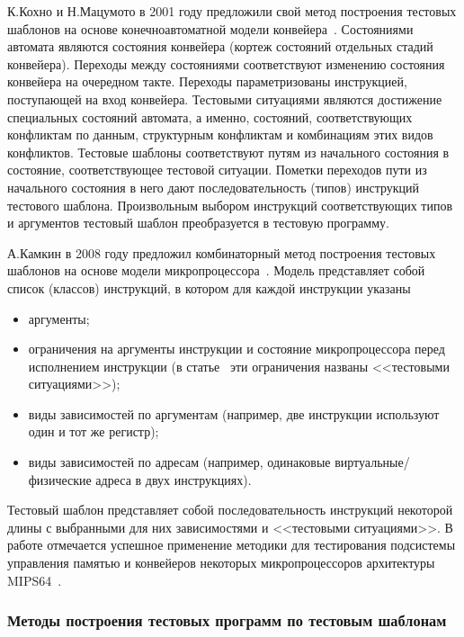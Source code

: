 К.Кохно и Н.Мацумото в 2001 году предложили свой метод построения тестовых шаблонов на основе конечноавтоматной модели конвейера~\cite{mVpGen}. Состояниями автомата являются состояния конвейера (кортеж состояний отдельных стадий конвейера). Переходы между состояниями соответствуют изменению состояния конвейера на очередном такте. Переходы параметризованы инструкцией, поступающей на вход конвейера. Тестовыми ситуациями являются достижение специальных состояний автомата, а именно, состояний, соответствующих конфликтам по данным, структурным конфликтам и комбинациям этих видов конфликтов. Тестовые шаблоны соответствуют путям из начального состояния в состояние, соответствующее тестовой ситуации. Пометки переходов пути из начального состояния в него дают последовательность (типов) инструкций тестового шаблона. Произвольным выбором инструкций соответствующих типов и аргументов тестовый шаблон преобразуется в тестовую программу.

А.Камкин в 2008 году предложил комбинаторный метод построения тестовых шаблонов на основе модели микропроцессора~\cite{MicroTESK}. Модель представляет собой список (классов) инструкций, в котором для каждой инструкции указаны
\begin{itemize}
\item аргументы;
\item ограничения на аргументы инструкции и состояние микропроцессора перед исполнением инструкции (в статье~\cite{MicroTESK} эти ограничения названы <<тестовыми ситуациями>>);
\item виды зависимостей по аргументам (например, две инструкции используют один и тот же регистр);
\item виды зависимостей по адресам (например, одинаковые виртуальные/физические адреса в двух инструкциях).
\end{itemize}

Тестовый шаблон представляет собой последовательность инструкций некоторой длины с выбранными для них зависимостями и <<тестовыми ситуациями>>. В работе отмечается успешное применение методики для тестирования подсистемы управления памятью и конвейеров некоторых микропроцессоров архитектуры MIPS64~\cite{mips64II}.

\subsubsection{Методы построения тестовых программ по тестовым шаблонам}%

